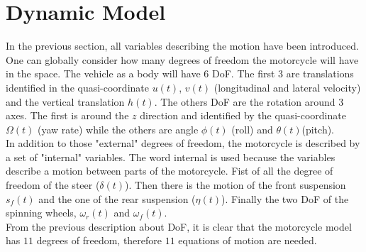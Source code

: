\section{Dynamic Model}
%
In the previous section, all variables describing the motion have been introduced. One can globally consider how many degrees of freedom the motorcycle will have in the space. The vehicle as a body will have 6 DoF. The first 3 are translations identified in the quasi-coordinate $u(t)$, $v(t)$ (longitudinal and lateral velocity) and the vertical translation $h(t)$. The others DoF are the rotation around 3 axes. The first is around the $z$ direction and identified by the quasi-coordinate $\Omega(t)$ (yaw rate) while the others are angle $\phi(t)$ (roll) and $\theta(t)$(pitch).\\
In addition to those "external" degrees of freedom, the motorcycle is described by a set of "internal" variables. The word internal is used because the variables describe a motion between parts of the motorcycle. Fist of all the degree of freedom of the steer ($\delta(t)$). Then there is the motion of the front suspension $s_f(t)$ and the one of the rear suspension ($\eta(t)$). Finally the two DoF of the spinning wheels, $\omega_r(t)$ and $\omega_f(t)$.\\
From the previous description about DoF, it is clear that the motorcycle model has $11$ degrees of freedom, therefore $11$ equations of motion are needed.
%
